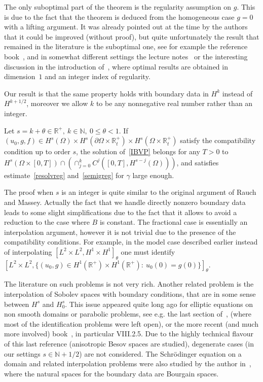 \documentclass[AHL,Unicode,longabstracts,published]{cedram}
\newcommand{\R}{\mathbb{R}}
\newcommand{\N}{\mathbb{N}}
\newcommand{\N}{\mathbb{N}}
\begin{document}
The only suboptimal part of the theorem is the regularity assumption on $g$. This is due to the fact that the theorem is deduced from the homogeneous case $g=0$ with a lifting argument. It was already pointed out at the time by the authors that it could be improved (without proof), but quite unfortunately the result that remained in the literature is the suboptimal one, see for example the reference book~\cite{Benzoni3}, and in somewhat different settings the lecture notes~\cite{Met2} or the interesting discussion in the introduction of~\cite{lanigu}, where optimal results are obtained in dimension~$1$ and an integer index of regularity.


Our result is that the same property holds with boundary data in $H^k$ instead of $H^{k+1/2}$, moreover we allow $k$ to be any nonnegative real number rather than an integer.

\begin{theo}\label{mainth}
Let $s=k+\theta\in \R^+,\ k\in \N,\ 0\leq \theta<1$. If $(u_0,g,f)\in H^s(\Omega)\times H^{s}(\partial \Omega\times \R_t^+)
\times H^s(\Omega\times \R_t^+)$ satisfy the compatibility condition up to order $s$, the solution of~\eqref{IBVP} belongs for any $T>0$ to $H^s(\Omega\times [0,T])\cap (\cap_{j=0}^k C^j([0,T],H^{s-j}(\Omega)))$, and satisfies estimate~\eqref{resolvreg} and~\eqref{semigreg} for $\gamma$ large enough.
\end{theo}

The proof when $s$ is an integer is quite similar to the original argument of Rauch and Massey. Actually the fact that we handle directly nonzero boundary data leads to some slight simplifications due to the fact that it allows to avoid a reduction to the case where $B$ is constant. The fractional case is essentially an interpolation argument, however it is not trivial due to the presence of the compatibility conditions. For example, in the model case described earlier instead of interpolating $[L^2\times L^2,H^1\times H^1]_\theta$ one must identify $[L^2\times L^2,\{(u_0,g)\in H^1(\R^+)\times H^1(\R^+):\ u_0(0)=g(0)\}]_\theta$.


The literature on such problems is not very rich. Another related problem is the interpolation of Sobolev spaces with boundary conditions, that are in some sense between $H^s$ and $H^s_0$. This issue appeared quite long ago for elliptic equations on non smooth domains or parabolic problems, see e.g. the last section of~\cite{Grisvard}, \cite[Sections~14-17 of Chapter~4]{lionsmagenes2} (where most of the identification problems were left open), or the more recent (and much more involved) book~\cite{Amann2}, in particular VIII.2.5. Due to the highly technical flavour of this last reference (anisotropic Besov spaces are studied), degenerate cases (in our settings $s\in \N+1/2$) are not considered. The Schr\"odinger equation on a domain and related interpolation problems were also studied by the author in~\cite{Audiard7}, where the natural spaces for the boundary data are Bourgain spaces.
\end{document}
